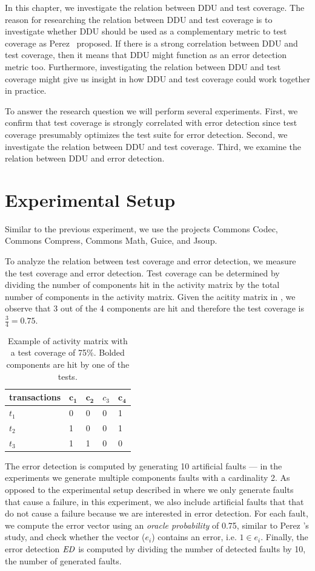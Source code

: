 \documentclass[twoside,a4paper,11pt]{memoir}
\begin{document}
In this chapter, we investigate the relation between DDU and test coverage.
The reason for researching the relation between DDU and test coverage is to investigate whether DDU should be used as a complementary metric to test coverage as Perez \etal\ proposed.
If there is a strong correlation between DDU and test coverage, then it means that DDU might function as an error detection metric too.
Furthermore, investigating the relation between DDU and test coverage might give us insight in how DDU and test coverage could work together in practice.

To answer the research question we will perform several experiments.
First, we confirm that test coverage is strongly correlated with error detection since test coverage presumably optimizes the test suite for error detection.
Second, we investigate the relation between DDU and test coverage.
Third, we examine the relation between DDU and error detection.


\section{Experimental Setup}
Similar to the previous experiment, we use the projects Commons Codec, Commons Compress, Commons Math, Guice, and Jsoup.

To analyze the relation between test coverage and error detection, we measure the test coverage and error detection.
Test coverage can be determined by dividing the number of components hit in the activity matrix by the total number of components in the activity matrix.
Given the acitity matrix in , we observe that 3 out of the 4 components are hit and therefore the test coverage is \(\frac{3}{4} = 0.75 \).
\begin{table}[]
\centering
\caption{Example of activity matrix with a test coverage of 75\%. Bolded components are hit by one of the tests.}%
\label{tab:test_coverage}
\begin{tabular}{l|llll}
transactions & \(\mathbf{c_1} \) & \(\mathbf{c_2} \) & \(c_3 \) & \(\mathbf{c_4} \) \\ \hline
\(t_1 \) & 0 & 0 & 0 & 1 \\
\(t_2 \) & 1 & 0 & 0 & 1 \\
\(t_3 \) & 1 & 1 & 0 & 0
\end{tabular}
\end{table}

The error detection is computed by generating 10 artificial faults --- in the experiments we generate multiple components faults with a cardinality 2.
As opposed to the experimental setup described in  where we only generate faults that cause a failure, in this experiment, we also include artificial faults that that do not cause a failure because we are interested in error detection.
For each fault, we compute the error vector using an \emph{oracle probability} of 0.75, similar to Perez \etal's study, and check whether the vector (\(e_i\)) contains an error, i.e. \( 1 \in e_i \).
Finally, the error detection \(\emph{ED}\) is computed by dividing the number of detected faults by 10, the number of generated faults.
\end{document}
